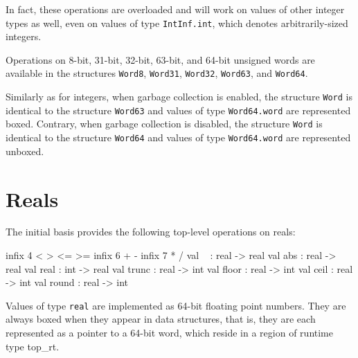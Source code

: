 \documentclass[12pt]{book}
\begin{document}
In fact, these operations are overloaded and will work on values of other
integer types as well, even on values of type \lstinline{IntInf.int}, which denotes
arbitrarily-sized integers.

Operations on 8-bit, 31-bit, 32-bit, 63-bit, and 64-bit unsigned words are available
in the structures
%
%
\lstinline{Word8},
%
%
\lstinline{Word31},
%
%
\lstinline{Word32},
%
%
\lstinline{Word63}, and
%
%
\lstinline{Word64}.

Similarly as for integers, when garbage collection is enabled, the structure
\lstinline{Word} is identical to the structure \lstinline{Word63} and values of
type \lstinline{Word64.word} are represented boxed. Contrary, when garbage
collection is disabled, the structure \lstinline{Word} is identical to the
structure \lstinline{Word64} and values of type \lstinline{Word64.word} are
represented unboxed.

\section{Reals}

The
%
%
initial basis provides the following top-level operations on reals:
%
%
%
%
%
%
%
%
%
%
%
%
%
%
%
%
%
%
\begin{smlcode}
  infix     4 < > <= >=
  infix     6 + -
  infix     7  * /
  val ~     : real -> real
  val abs   : real -> real
  val real  : int -> real
  val trunc : real -> int
  val floor : real -> int
  val ceil  : real -> int
  val round : real -> int
\end{smlcode}

\noindent
Values of type \lstinline{real} are implemented as 64-bit floating point numbers.
They are always boxed when they appear in data structures, that is, they are
each represented as a pointer to a 64-bit
%
%
word, which reside in a region of runtime type {\sc top\_rt}.
\end{document}
